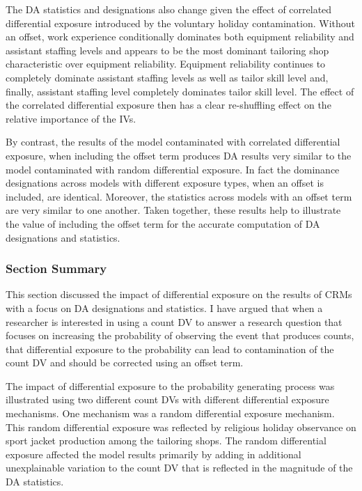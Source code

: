 \documentclass[ShortAfour,times,sageapa]{sagej}
\begin{document}
	The DA statistics and designations also change given the effect of correlated differential exposure introduced by the voluntary holiday contamination.
	Without an offset, work experience conditionally dominates both equipment reliability and assistant staffing levels and appears to be the most dominant tailoring shop characteristic over equipment reliability.
	Equipment reliability continues to completely dominate assistant staffing levels as well as tailor skill level and, finally, assistant staffing level completely dominates tailor skill level.
	The effect of the correlated differential exposure then has a clear re-shuffling effect on the relative importance of the IVs.
	
	By contrast, the results of the model contaminated with correlated differential exposure, when including the offset term produces DA results very similar to the model contaminated with random differential exposure.
	In fact the dominance designations across models with different exposure types, when an offset is included, are identical.
	Moreover, the statistics across models with an offset term are very similar to one another.
	Taken together, these results help to illustrate the value of including the offset term for the accurate computation of DA designations and statistics.	
	
		\subsubsection{Section Summary}
		
	This section discussed the impact of differential exposure on the results of CRMs with a focus on DA designations and statistics.
	I have argued that when a researcher is interested in using a count DV to answer a research question that focuses on increasing the probability of observing the event that produces counts, that differential exposure to the probability can lead to contamination of the count DV and should be corrected using an offset term.
	
	The impact of differential exposure to the probability generating process was illustrated using two different count DVs with different differential exposure mechanisms.
	One mechanism was a random differential exposure mechanism.
	This random differential exposure was reflected by religious holiday observance on sport jacket production among the tailoring shops.
	The random differential exposure affected the model results primarily by adding in additional unexplainable variation to the count DV that is reflected in the magnitude of the DA statistics.
	
\end{document}
